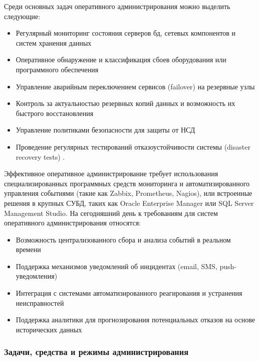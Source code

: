 Среди основных задач оперативного администрирования можно выделить следующие:
\begin{itemize}
    \item Регулярный мониторинг состояния серверов бд, сетевых компонентов и систем хранения данных
    \item Оперативное обнаружение и классификация сбоев оборудования или программного обеспечения
    \item Управление аварийным переключением сервисов (failover) на резервные узлы
    \item Контроль за актуальностью резервных копий данных и возможность их быстрого восстановления
    \item Управление политиками безопасности для защиты от НСД
    \item Проведение регулярных тестирований отказоустойчивости системы (disaster recovery tests) \autocite{Kleppmann}.
\end{itemize}

Эффективное оперативное администрирование требует использования специализированных программных средств мониторинга и автоматизированного управления событиями (такие как Zabbix, Prometheus, Nagios), или встроенные решения в крупных СУБД, таких как Oracle Enterprise Manager или SQL Server Management Studio.
На сегодняшний день к требованиям для систем оперативного администрирования относятся:
\begin{itemize}
    \item Возможность централизованного сбора и анализа событий в реальном времени
    \item Поддержка механизмов уведомлений об инцидентах (email, SMS, push-уведомления)
    \item Интеграция с системами автоматизированного реагирования и устранения неисправностей
    \item Поддержка аналитики для прогнозирования потенциальных отказов на основе исторических данных \autocite{Afonin}
\end{itemize}




\subsubsection{Задачи, средства и режимы администрирования} ~\\

